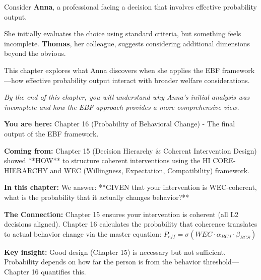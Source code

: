 \begin{tcolorbox}[
    colback=blue!5!white,
    colframe=blue!75!black,
    title={\textbf{Intuition: A Motivating Example}},
    fonttitle=\bfseries
]
Consider \textbf{Anna}, a professional facing a decision that involves effective probability output.

She initially evaluates the choice using standard criteria, but something feels incomplete.
\textbf{Thomas}, her colleague, suggests considering additional dimensions beyond the obvious.

This chapter explores what Anna discovers when she applies the EBF framework---how
effective probability output interact with broader welfare considerations.

\medskip
\textit{By the end of this chapter, you will understand why Anna's initial analysis
was incomplete and how the EBF approach provides a more comprehensive view.}
\end{tcolorbox}





\begin{tcolorbox}[colback=blue!10!white, colframe=blue!75!black, title=Reading Path: From Chapter 15 (HI CORE-HIERARCHY)]

\textbf{You are here:} Chapter 16 (Probability of Behavioral Change) - The final output of the EBF framework.

\textbf{Coming from:} Chapter 15 (Decision Hierarchy \& Coherent Intervention Design) showed **HOW** to structure coherent interventions using the HI CORE-HIERARCHY and WEC (Willingness, Expectation, Compatibility) framework.

\textbf{In this chapter:} We answer: **GIVEN that your intervention is WEC-coherent, what is the probability that it actually changes behavior?**

\textbf{The Connection:} Chapter 15 ensures your intervention is coherent (all L2 decisions aligned). Chapter 16 calculates the probability that coherence translates to actual behavior change via the master equation: $P_{eff} = \sigma(WEC \cdot \alpha_{BCJ} \cdot \beta_{BCS})$

\textbf{Key insight:} Good design (Chapter 15) is necessary but not sufficient. Probability depends on how far the person is from the behavior threshold---Chapter 16 quantifies this.

\end{tcolorbox}


